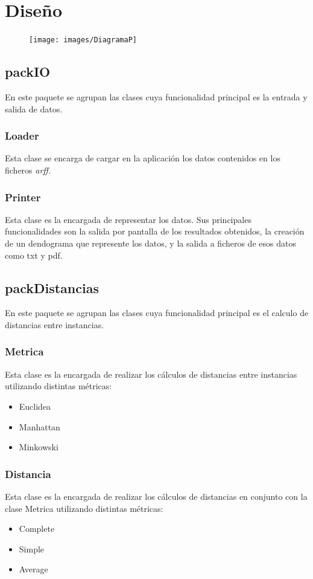 \documentclass[11pt, titlepage,a4paper]{article}
\begin{document}
\section{Diseño}
\begin{figure}[hbtp]
\centering
\texttt{[image: images/DiagramaP]}
\end{figure}

\subsection{packIO}
En este paquete se agrupan las clases cuya funcionalidad principal es la entrada
y salida de datos.

\subsubsection{Loader}
Esta clase se encarga de cargar en la aplicación los datos contenidos en los
ficheros \textit{arff}.

\subsubsection{Printer}
Esta clase es la encargada de representar los datos. Sus principales
funcionalidades son la salida por pantalla de los resultados obtenidos, la
creación de un dendograma que represente los datos, y la salida a ficheros de
esos datos como txt y pdf.

\subsection{packDistancias}
\label{packDistancias}
En este paquete se agrupan las clases cuya funcionalidad principal es el calculo
de distancias entre instancias.

\subsubsection{Metrica}
Esta clase es la encargada de realizar los cálculos de distancias entre
instancias utilizando distintas métricas:
\begin{itemize}
  \item Euclidea
  \item Manhattan
  \item Minkowski
\end{itemize}

\subsubsection{Distancia}
Esta clase es la encargada de realizar los cálculos de distancias en conjunto
con la clase Metrica utilizando distintas métricas:
\begin{itemize}
  \item Complete
  \item Simple
  \item Average
\end{itemize}
\end{document}
